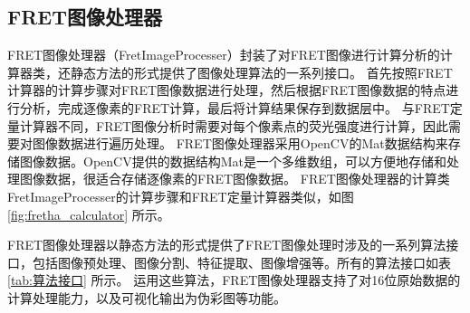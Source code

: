 \subsection{FRET图像处理器}
FRET图像处理器（FretImageProcesser）封装了对FRET图像进行计算分析的计算器类，还静态方法的形式提供了图像处理算法的一系列接口。
首先按照FRET计算器的计算步骤对FRET图像数据进行处理，然后根据FRET图像数据的特点进行分析，完成逐像素的FRET计算，最后将计算结果保存到数据层中。
与FRET定量计算器不同，FRET图像分析时需要对每个像素点的荧光强度进行计算，因此需要对图像数据进行遍历处理。
FRET图像处理器采用OpenCV的Mat数据结构来存储图像数据。OpenCV提供的数据结构Mat是一个多维数组，可以方便地存储和处理图像数据，很适合存储逐像素的FRET图像数据。
FRET图像处理器的计算类FretImageProcesser的计算步骤和FRET定量计算器类似，如图 \ref{fig:fretha_calculator} 所示。

FRET图像处理器以静态方法的形式提供了FRET图像处理时涉及的一系列算法接口，包括图像预处理、图像分割、特征提取、图像增强等。所有的算法接口如表 \ref{tab:算法接口} 所示。
运用这些算法，FRET图像处理器支持了对16位原始数据的计算处理能力，以及可视化输出为伪彩图等功能。

